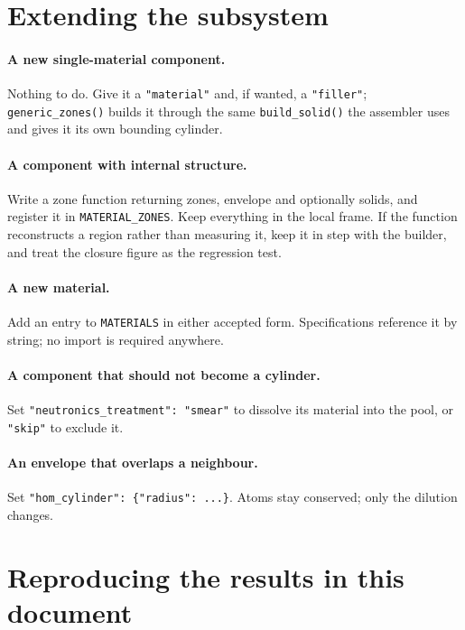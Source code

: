 \documentclass[9pt,a4paper]{extarticle}
\newcommand{\code}[1]{\texttt{\small #1}}
\begin{document}
\section{Extending the subsystem}

\paragraph{A new single-material component.} Nothing to do. Give it a
\code{"material"} and, if wanted, a \code{"filler"}; \code{generic\_zones()}
builds it through the same \code{build\_solid()} the assembler uses and gives it
its own bounding cylinder.

\paragraph{A component with internal structure.} Write a zone function returning
zones, envelope and optionally solids, and register it in
\code{MATERIAL\_ZONES}. Keep everything in the local frame. If the function
reconstructs a region rather than measuring it, keep it in step with the
builder, and treat the closure figure as the regression test.

\paragraph{A new material.} Add an entry to \code{MATERIALS} in either accepted
form. Specifications reference it by string; no import is required anywhere.

\paragraph{A component that should not become a cylinder.} Set
\code{"neutronics\_treatment": "smear"} to dissolve its material into the pool,
or \code{"skip"} to exclude it.

\paragraph{An envelope that overlaps a neighbour.} Set
\code{"hom\_cylinder": \{"radius": ...\}}. Atoms stay conserved; only the
dilution changes.

\section{Reproducing the results in this document}
\label{sec:repro}
\end{document}
